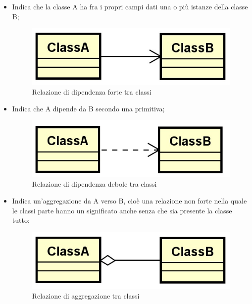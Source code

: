 \begin{itemize}

\item Indica che la classe A ha fra i propri campi dati una o più istanze della classe B;
\begin{figure} [H]
	\centering
	\includegraphics[scale=0.75]{./Img/dipendenza_forte.jpg}
	\caption{Relazione di dipendenza forte tra classi}\label{}
\end{figure}

\item  Indica che A dipende da B secondo una primitiva;
\begin{figure} [H]
	\centering
	\includegraphics[scale=0.75]{./Img/dipendenza.jpg}
	\caption{Relazione di dipendenza debole tra classi}\label{}
\end{figure}

\item Indica un'aggregazione da A verso B, cioè una relazione non forte nella quale le classi parte hanno un significato anche senza che sia presente la classe tutto;
\begin{figure} [H]
	\centering
	\includegraphics[scale=0.75]{./Img/aggregazione.jpg}
	\caption{Relazione di aggregazione tra classi}\label{}
\end{figure}


\end{itemize}
